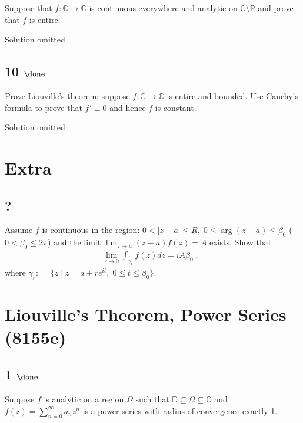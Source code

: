 Suppose that \(f: {\mathbb{C}}\to{\mathbb{C}}\) is continuous everywhere
and analytic on \({\mathbb{C}}\setminus {\mathbb{R}}\) and prove that
\(f\) is entire.


Solution omitted.

\hypertarget{done-2}{%
\subsection{\texorpdfstring{10
\(\done\)}{10 \textbackslash done}}\label{done-2}}

Prove Liouville's theorem: suppose \(f:{\mathbb{C}}\to{\mathbb{C}}\) is
entire and bounded. Use Cauchy's formula to prove that \(f'\equiv 0\)
and hence \(f\) is constant.

Solution omitted.

\hypertarget{extra}{%
\section{Extra}\label{extra}}

\hypertarget{section-4}{%
\subsection{?}\label{section-4}}

Assume \(f\) is continuous in the region:
\(0< |z-a| \leq R, \; 0 \leq \arg(z-a) \leq \beta_0\)
(\(0 < \beta_0 \leq 2 \pi\)) and the limit
\(\displaystyle \lim_{z \rightarrow a} (z-a) f(z) = A\) exists. Show
that
\begin{align*}\lim_{r \rightarrow 0} \int_{\gamma_r} f(z) dz  = i A \beta_0 \; , \; \;\end{align*}
where
\(\gamma_r : = \{ z \; | \; z = a + r e^{it}, \; 0 \leq t \leq \beta_0 \}.\)

\hypertarget{liouvilles-theorem-power-series-8155e}{%
\section{Liouville's Theorem, Power Series
(8155e)}\label{liouvilles-theorem-power-series-8155e}}

\hypertarget{done-3}{%
\subsection{\texorpdfstring{1
\(\done\)}{1 \textbackslash done}}\label{done-3}}

Suppose \(f\) is analytic on a region \(\Omega\) such that
\({\mathbb{D}}\subseteq \Omega \subseteq {\mathbb{C}}\) and
\(f(z) = \sum_{n=0}^\infty a_n z^n\) is a power series with radius of
convergence exactly 1.

